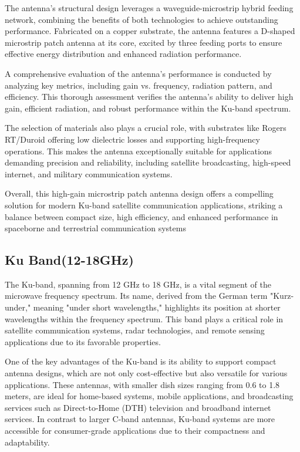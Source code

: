 \documentclass[12pt]{article}
\begin{document}
\par The antenna's structural design leverages a waveguide-microstrip hybrid feeding network, combining the benefits of both technologies to achieve outstanding performance. Fabricated on a copper substrate, the antenna features a D-shaped microstrip patch antenna at its core, excited by three feeding ports to ensure effective energy distribution and enhanced radiation performance.\\

\par A comprehensive evaluation of the antenna's performance is conducted by analyzing key metrics, including gain vs. frequency, radiation pattern, and efficiency. This thorough assessment verifies the antenna's ability to deliver high gain, efficient radiation, and robust performance within the Ku-band spectrum.\\

\par The selection of materials also plays a crucial role, with substrates like Rogers RT/Duroid offering low dielectric losses and supporting high-frequency operations. This makes the antenna exceptionally suitable for applications demanding precision and reliability, including satellite broadcasting, high-speed internet, and military communication systems.\\

\par Overall, this high-gain microstrip patch antenna design offers a compelling solution for modern Ku-band satellite communication applications, striking a balance between compact size, high efficiency, and enhanced performance in spaceborne and terrestrial communication systems\\

\newpage
\subsection{Ku Band(12-18GHz)}
\par The Ku-band, spanning from 12 GHz to 18 GHz, is a vital segment of the microwave frequency spectrum. Its name, derived from the German term "Kurz-under," meaning "under short wavelengths," highlights its position at shorter wavelengths within the frequency spectrum. This band plays a critical role in satellite communication systems, radar technologies, and remote sensing applications due to its favorable properties.\\

\par One of the key advantages of the Ku-band is its ability to support compact antenna designs, which are not only cost-effective but also versatile for various applications. These antennas, with smaller dish sizes ranging from 0.6 to 1.8 meters, are ideal for home-based systems, mobile applications, and broadcasting services such as Direct-to-Home (DTH) television and broadband internet services. In contrast to larger C-band antennas, Ku-band systems are more accessible for consumer-grade applications due to their compactness and adaptability.\\
\end{document}
